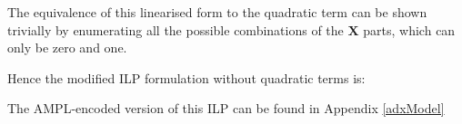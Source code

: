 The equivalence of this linearised form to the quadratic term can be shown trivially by enumerating all the possible combinations of the $\mathbf{X}$ parts, which can only be zero and one.

Hence the modified ILP formulation without quadratic terms is:



The AMPL-encoded version of this ILP can be found in Appendix \ref{adxModel}
